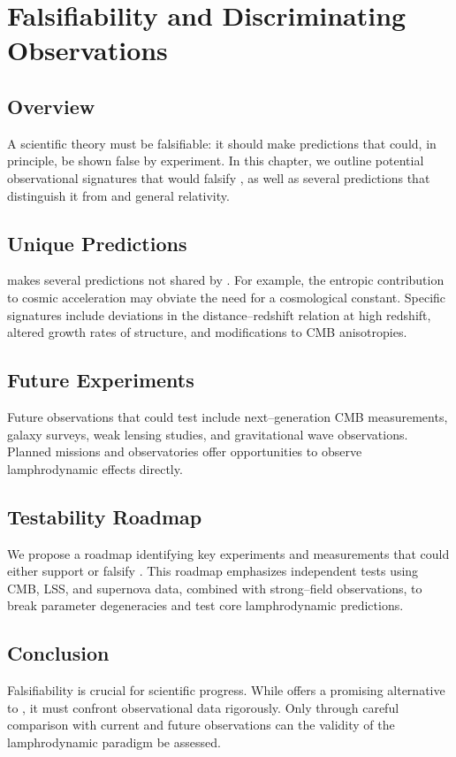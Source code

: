 
\chapter{Falsifiability and Discriminating Observations}
\label{chap:falsifiability}

\section{Overview}

A scientific theory must be falsifiable: it should make predictions that
could, in principle, be shown false by experiment. In this chapter, we
outline potential observational signatures that would falsify \rsvpabbr{},
as well as several predictions that distinguish it from \LCDM{} and
general relativity.

\section{Unique Predictions}

\rsvpabbr{} makes several predictions not shared by \LCDM{}. For example,
the entropic contribution to cosmic acceleration may obviate the need for a
cosmological constant. Specific signatures include deviations in the
distance--redshift relation at high redshift, altered growth rates of
structure, and modifications to CMB anisotropies.

\section{Future Experiments}

Future observations that could test \rsvpabbr{} include next--generation CMB
measurements, galaxy surveys, weak lensing studies, and gravitational wave
observations. Planned missions and observatories offer opportunities to
observe lamphrodynamic effects directly.

\section{Testability Roadmap}

We propose a roadmap identifying key experiments and measurements that could
either support or falsify \rsvpabbr{}. This roadmap emphasizes independent
tests using CMB, LSS, and supernova data, combined with strong--field
observations, to break parameter degeneracies and test core lamphrodynamic
predictions.

\section{Conclusion}

Falsifiability is crucial for scientific progress. While \rsvpabbr{} offers a
promising alternative to \LCDM{}, it must confront observational data
rigorously. Only through careful comparison with current and future
observations can the validity of the lamphrodynamic paradigm be assessed.

\clearpage
